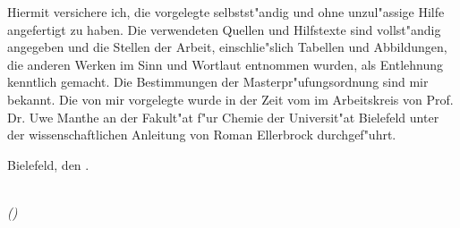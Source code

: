 \begin{large}

\vspace*{2cm}
\noindent
Hiermit versichere ich, die vorgelegte \workTyp selbstst"andig und ohne unzul"assige Hilfe angefertigt zu haben. 
Die verwendeten Quellen und Hilfstexte sind vollst"andig angegeben und die Stellen der Arbeit, einschlie"slich 
Tabellen und Abbildungen, die anderen Werken im Sinn und Wortlaut entnommen wurden, als Entlehnung kenntlich gemacht. 
Die Bestimmungen der Masterpr"ufungsordnung sind mir bekannt. Die von mir vorgelegte \workTyp wurde in der Zeit 
vom \workZeitraum im Arbeitskreis von Prof. Dr. Uwe Manthe an der Fakult"at f"ur Chemie der Universit"at Bielefeld 
unter der wissenschaftlichen Anleitung von Roman Ellerbrock durchgef"uhrt.

\vspace{2cm}

\noindent
Bielefeld, den \workDatum .

\vspace{3cm}

\hspace*{7cm}
\dotfill\\
\hspace*{8.5cm}
\textit{(\workNameStudent)}

\end{large}
